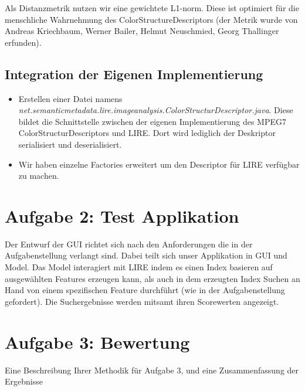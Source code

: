 \documentclass{article}
\newcommand{\mysection}[1]{\section*{#1} \setcounter{subsection}{0}}
\begin{document}
    Als Distanzmetrik nutzen wir eine gewichtete L1-norm. Diese ist optimiert für die menschliche Wahrnehmung des ColorStructureDescriptors (der Metrik wurde von Andreas Kriechbaum, Werner Bailer, Helmut Neuschmied, Georg Thallinger erfunden).
  \subsection{Integration der Eigenen Implementierung}
    \begin{itemize}
      \item Erstellen einer Datei namens \emph{net.semanticmetadata.lire.imageanalysis.ColorStructurDescriptor.java}. Diese bildet die Schnittstelle zwischen der eigenen Implementierung des MPEG7 ColorStructurDescriptors und LIRE. Dort wird lediglich der Deskriptor serialisiert und deserialisiert.
      \item Wir haben einzelne Factories erweitert um den Descriptor für LIRE verfügbar zu machen.
    \end{itemize}

\mysection{Aufgabe 2: Test Applikation}
  Der Entwurf der GUI richtet sich nach den Anforderungen die in der Aufgabenstellung verlangt sind.
  Dabei teilt sich unser Applikation in GUI und Model. Das Model interagiert mit LIRE indem es einen
  Index basieren auf ausgewählten Features erzeugen kann, als auch in dem erzeugten Index Suchen an Hand von einem
  spezifischen Feature durchführt (wie in der Aufgabenstellung gefordert). Die Suchergebnisse werden mitsamt ihren Scorewerten angezeigt.
  
\mysection{Aufgabe 3: Bewertung}
Eine Beschreibung Ihrer Methodik für Aufgabe 3, und eine Zusammenfassung der Ergebnisse
\end{document}
